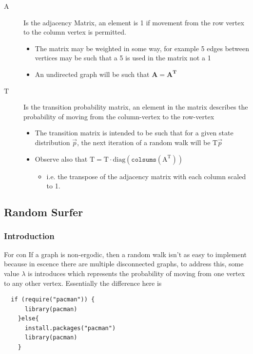 \documentclass[11pt]{article}
\begin{document}
\begin{description}
\item[{\(\mathrm{A}\)}] Is the adjacency Matrix, an element is 1 if movement from the row vertex to the column vertex is permitted.
\begin{itemize}
\item The matrix may be weighted in some way, for example 5 edges between vertices may be such that a 5 is used in the matrix not a 1
\item An undirected graph will be such that \(\mathbf{A} = \mathbf{A}^{\mathrm{\mathbf{T}}}\)
\end{itemize}
\item[{\(\mathrm{T}\)}] Is the transition probability matrix, an element in the matrix describes the probability of moving from the column-vertex to the row-vertex
\begin{itemize}
\item The transition matrix is intended to be such that for a given state distribution \(\vec{p}\), the next iteration of a random walk will be \(\mathrm{T}\vec{p}\)
\item Observe also that \(\mathrm{T} = \mathrm{T} \cdot \mathrm{diag}(\mathtt{colsums}(\mathrm{A^{\mathrm{T}}}))\)
\begin{itemize}
\item i.e. the transpose of the adjacency matrix with each column scaled to 1.
\end{itemize}
\end{itemize}
\end{description}

\subsection{Random Surfer}
\label{sec:orgee24454}
\subsubsection{Introduction}
\label{sec:org61724dc}
For con If a graph is non-ergodic, then a random walk isn't as easy to implement
because in escence there are multiple disconnected graphs, to address this, some
value \(\lambda\) is introduces which represents the probability of moving from
one vertex to any other vertex. Essentially the difference here is

\lstset{language=r,label= ,caption= ,captionpos=b,numbers=none}
\begin{lstlisting}
  if (require("pacman")) {
      library(pacman)
    }else{
      install.packages("pacman")
      library(pacman)
    }
\end{lstlisting}
\end{document}
